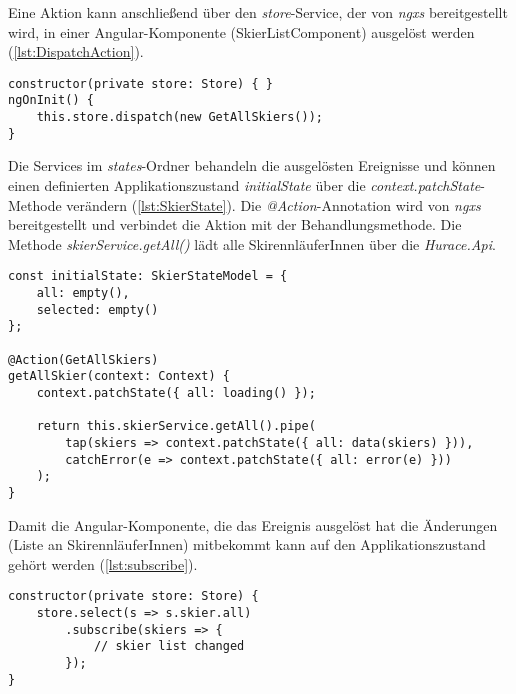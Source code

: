 Eine Aktion kann anschließend über den \emph{store}-Service, der von \emph{ngxs} bereitgestellt wird, in einer Angular-Komponente (\zB SkierListComponent) ausgelöst werden (\cref{lst:DispatchAction}).

\begin{lstlisting}[caption={Auslösen einer Skier-Aktion}, label=lst:DispatchAction]
constructor(private store: Store) { }
ngOnInit() {
    this.store.dispatch(new GetAllSkiers());
}
\end{lstlisting}

Die Services im \emph{states}-Ordner behandeln die ausgelösten Ereignisse und können einen definierten Applikationszustand \emph{initialState} über die \emph{context.patchState}-Methode verändern (\cref{lst:SkierState}).
Die \emph{@Action}-Annotation wird von \emph{ngxs} bereitgestellt und verbindet die Aktion mit der Behandlungsmethode.
Die Methode \emph{skierService.getAll()} lädt alle SkirennläuferInnen über die \emph{Hurace.Api}.

\begin{lstlisting}[caption={Behandeln einer Skier-Aktion}, label=lst:SkierState]
const initialState: SkierStateModel = {
    all: empty(),
    selected: empty()
};

@Action(GetAllSkiers)
getAllSkier(context: Context) {
    context.patchState({ all: loading() });

    return this.skierService.getAll().pipe(
        tap(skiers => context.patchState({ all: data(skiers) })),
        catchError(e => context.patchState({ all: error(e) }))
    );
}
\end{lstlisting}

Damit die Angular-Komponente, die das Ereignis ausgelöst hat die Änderungen (Liste an SkirennläuferInnen) mitbekommt kann auf den Applikationszustand gehört werden (\cref{lst:subscribe}).

\begin{lstlisting}[caption={Hören auf Zustandsänderungen}, label=lst:subscribe]
constructor(private store: Store) {
    store.select(s => s.skier.all)
        .subscribe(skiers => {
            // skier list changed
        });
}
\end{lstlisting}
